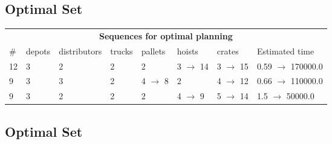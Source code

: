 \documentclass{article}
\begin{document}
                            \subsection*{Optimal Set}

                            \begin{center}
                            \begin{tabular}{@{}l|l|l|l|l|l|l|l@{}}
                            \multicolumn{8}{c}{\bf \large Sequences for optimal planning}\\
                            \# & depots & distributors & trucks & pallets & hoists & crates & Estimated time\\\midrule
                            12&3&2&2&2&3 $\rightarrow$ 14&3 $\rightarrow$ 15&0.59 $\rightarrow$ 170000.0\\
9&3&3&2&4 $\rightarrow$ 8&2&4 $\rightarrow$ 12&0.66 $\rightarrow$ 110000.0\\
9&3&2&2&2&4 $\rightarrow$ 9&5 $\rightarrow$ 14&1.5 $\rightarrow$ 50000.0
                            \end{tabular}
                            \end{center}
                    
                                \subsection*{Optimal Set}
                                
\end{document}
